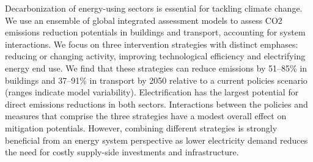 Decarbonization of energy-using sectors is essential for tackling climate change.
We use an ensemble of global integrated assessment models to assess CO2 emissions reduction potentials in buildings and transport, accounting for system interactions.
We focus on three intervention strategies with distinct emphases: reducing or changing activity, improving technological efficiency and electrifying energy end use. We find that these strategies can reduce emissions by 51–85\% in buildings and 37–91\% in transport by 2050 relative to a current policies scenario (ranges indicate model variability).
Electrification has the largest potential for direct emissions reductions in both sectors.
Interactions between the policies and measures that comprise the three strategies have a modest overall effect on mitigation potentials.
However, combining different strategies is strongly beneficial from an energy system perspective as lower electricity demand reduces the need for costly supply-side investments and infrastructure.

